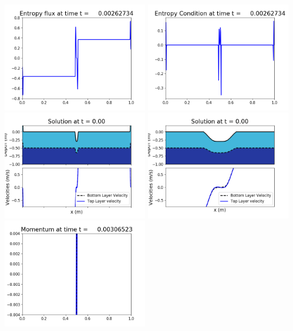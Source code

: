 \documentclass[11pt]{article}
\begin{document}
\includegraphics[width=0.475\textwidth]{frame0007fig1008.png}
\vskip 10pt 
\includegraphics[width=0.475\textwidth]{frame0007fig1009.png}
\vskip 10pt 
\includegraphics[width=0.475\textwidth]{frame0008fig1001.png}
\includegraphics[width=0.475\textwidth]{frame0008fig1002.png}
\vskip 10pt 
\includegraphics[width=0.475\textwidth]{frame0008fig1003.png}
\end{document}
